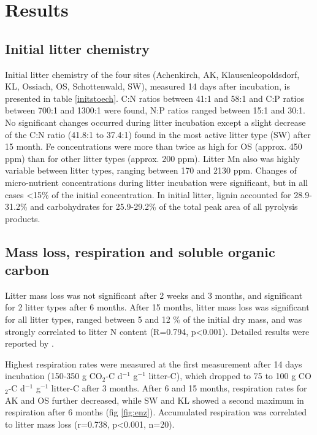 \section*{Results}
\subsection*{Initial litter chemistry}
Initial litter chemistry of the four sites (Achenkirch, AK, Klausenleopoldsdorf, KL, Ossiach, OS, Schottenwald, SW), measured 14 days after incubation, is presented in table \ref{initstoech}. C:N ratios between 41:1 and 58:1 and C:P ratios between 700:1 and 1300:1 were found, N:P ratios ranged between 15:1 and 30:1. No significant changes occurred during litter incubation except a slight decrease of the C:N ratio (41.8:1 to 37.4:1) found in the most active litter type (SW) after 15 month. Fe concentrations were more than twice as high for OS (approx. 450 ppm) than for other litter types (approx. 200 ppm). Litter Mn also was highly variable between litter types, ranging between 170 and 2130 ppm. Changes of micro-nutrient concentrations during litter incubation were significant, but in all cases \textless 15\% of the initial concentration. In initial litter, lignin accounted for 28.9-31.2\% and carbohydrates for 25.9-29.2\% of the total peak area of all pyrolysis products.

\subsection*{Mass loss, respiration and soluble organic carbon}

Litter mass loss was not significant after 2 weeks and 3 months, and significant for 2 litter types after 6 months. After 15 months, litter mass loss was significant for all litter types, ranged between 5 and 12 \% of the initial dry mass, and was strongly correlated to litter N content (R=0.794, p\textless 0.001). Detailed results were reported by \cite{Mooshammer2011}.

Highest respiration rates were measured at the first measurement after 14 days incubation (150-350 \textmu g CO$_2$-C d$^{-1}$ g$^{-1}$ litter-C), which dropped to 75 to 100 \textmu g CO$_2$-C d$^{-1}$ g$^{-1}$ litter-C after 3 months. After 6 and 15 months, respiration rates for AK and OS further decreased, while SW and KL showed a second maximum in respiration after 6 months (fig \ref{fig:enz}). Accumulated respiration was correlated to litter mass loss (r=0.738, p\textless 0.001, n=20).%

